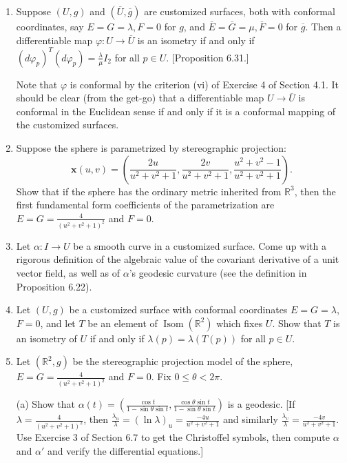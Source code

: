 \documentclass[leqno]{book}
\begin{document}
\begin{enumerate}
\item Suppose $(U,g)$ and $(\overline U,\overline g)$ are customized surfaces, both with conformal coordinates, say $E=G=\lambda,F=0$ for $g$, and $\overline E=\overline G=\mu,\overline F=0$ for $\overline g$.  Then a differentiable map $\varphi:U\to\overline U$ is an isometry if and only if $(d\varphi_p)^T(d\varphi_p)=\frac{\lambda}{\mu}I_2$ for all $p\in U$.  [Proposition 6.31.]

Note that $\varphi$ is conformal by the criterion (vi) of Exercise 4 of Section 4.1.  It should be clear (from the get-go) that a differentiable map $U\to\overline U$ is conformal in the Euclidean sense if and only if it is a conformal mapping of the customized surfaces.

\item Suppose the sphere is parametrized by stereographic projection:
$$\mathbf x(u,v)=\left(\frac{2u}{u^2+v^2+1},\frac{2v}{u^2+v^2+1},\frac{u^2+v^2-1}{u^2+v^2+1}\right).$$
Show that if the sphere has the ordinary metric inherited from $\mathbb R^3$, then the first fundamental form coefficients of the parametrization are $E=G=\frac 4{(u^2+v^2+1)^2}$ and $F=0$.

\item Let $\alpha:I\to U$ be a smooth curve in a customized surface.  Come up with a rigorous definition of the algebraic value of the covariant derivative of a unit vector field, as well as of $\alpha$'s geodesic curvature (see the definition in Proposition 6.22).

\item Let $(U,g)$ be a customized surface with conformal coordinates $E=G=\lambda$, $F=0$, and let $T$ be an element of $\operatorname{Isom}(\mathbb R^2)$ which fixes $U$.  Show that $T$ is an isometry of $U$ if and only if $\lambda(p)=\lambda(T(p))$ for all $p\in U$.

\item Let $(\mathbb R^2,g)$ be the stereographic projection model of the sphere, $E=G=\frac 4{(u^2+v^2+1)^2}$ and $F=0$.  Fix $0\leqslant\theta<2\pi$.

(a) Show that $\alpha(t)=\left(\frac{\cos t}{1-\sin\theta\sin t},\frac{\cos\theta\sin t}{1-\sin\theta\sin t}\right)$ is a geodesic.  [If $\lambda=\frac 4{(u^2+v^2+1)^2}$, then $\frac{\lambda_u}{\lambda}=(\ln\lambda)_u=\frac{-4u}{u^2+v^2+1}$ and similarly $\frac{\lambda_v}{\lambda}=\frac{-4v}{u^2+v^2+1}$.  Use Exercise 3 of Section 6.7 to get the Christoffel symbols, then compute $\alpha$ and $\alpha'$ and verify the differential equations.]


\end{enumerate}
\end{document}
